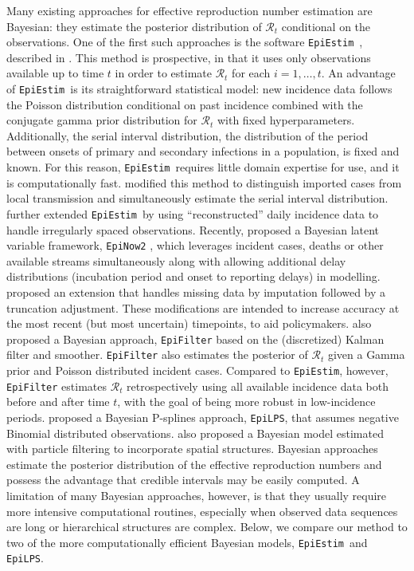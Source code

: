\documentclass[10pt,letterpaper]{article}
\def\EpiEstim{\texttt{EpiEstim}}
\def\EpiLPS{\texttt{EpiLPS}}
\def\calR{\mathcal{R}}
\newcommand{\citep}[1]{\cite{#1}}
\begin{document}
Many existing approaches for effective reproduction number estimation are
Bayesian: they estimate the posterior distribution of $\calR_t$ conditional on
the observations. One of the first such approaches is the software \EpiEstim\
\citep{cori2020package}, described in \cite{cori2013new}. This method is
prospective, in that it uses only observations available up to time $t$ in order
to estimate $\calR_t$ for each $i = 1,\ldots, t$. An advantage of \EpiEstim\ is
its straightforward statistical model: new incidence data follows the Poisson
distribution conditional on past incidence combined with the conjugate gamma
prior distribution for $\calR_t$ with fixed hyperparameters. Additionally, the
serial interval distribution, the distribution of the period between onsets of
primary and secondary infections in a population, is fixed and known. For this
reason, \EpiEstim\ requires little domain expertise for use, and it is
computationally fast. \cite{thompson2019improved} modified this method to
distinguish imported cases from local transmission and simultaneously estimate
the serial interval distribution. \cite{nash2023estimating} further extended
\EpiEstim\ by using ``reconstructed'' daily incidence data to handle irregularly
spaced observations. Recently, \cite{abbott2020estimating} proposed a Bayesian
latent variable framework, \texttt{EpiNow2} \citep{EpiNow2}, which leverages
incident cases, deaths or other available streams simultaneously along with
allowing additional delay distributions (incubation period and onset to
reporting delays) in modelling.  
\cite{lison2023generative} proposed an extension that handles missing data by
imputation followed by a truncation adjustment. These modifications are intended
to increase accuracy at the most recent (but most uncertain) timepoints, to aid 
policymakers. \cite{parag2021improved} also proposed a Bayesian approach, 
\texttt{EpiFilter} based on the (discretized) Kalman filter and smoother. 
\texttt{EpiFilter} also estimates the posterior of $\calR_t$ given a Gamma 
prior and Poisson distributed incident cases. Compared to \EpiEstim, 
however, \texttt{EpiFilter} estimates $\calR_t$ retrospectively using all 
available incidence data both before and after time $t$, with the goal of being 
more robust in low-incidence periods. \cite{gressani2022epilps} proposed a 
Bayesian P-splines approach, \EpiLPS, that assumes negative Binomial distributed 
observations. \cite{trevisin2023spatially} also proposed a Bayesian model estimated 
with particle filtering to incorporate spatial structures. 
Bayesian approaches estimate the posterior distribution of the effective
reproduction numbers and possess the advantage that credible intervals may be
easily computed. A limitation of many Bayesian approaches, however, is that they
usually require more intensive computational routines, especially when observed
data sequences are long or hierarchical structures are complex.  Below, we
compare our method to two of the more computationally efficient Bayesian models,
\EpiEstim\ and \EpiLPS. 
\end{document}
